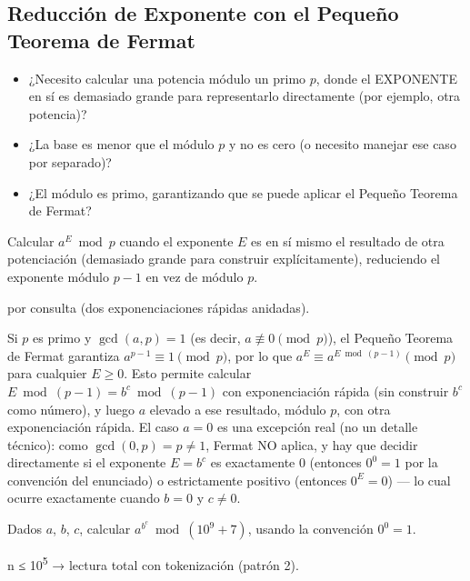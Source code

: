 \subsection{Reducción de Exponente con el Pequeño Teorema de Fermat}


\begin{itemize}
\item ¿Necesito calcular una potencia módulo un primo $p$, donde el EXPONENTE en sí es demasiado grande para representarlo directamente (por ejemplo, otra potencia)?
\item ¿La base es menor que el módulo $p$ y no es cero (o necesito manejar ese caso por separado)?
\item ¿El módulo es primo, garantizando que se puede aplicar el Pequeño Teorema de Fermat?
\end{itemize}

 Calcular $a^{E} \bmod p$ cuando el exponente $E$ es en sí mismo el resultado de otra potenciación (demasiado grande para construir explícitamente), reduciendo el exponente módulo $p-1$ en vez de módulo $p$.

  por consulta (dos exponenciaciones rápidas anidadas).

 Si $p$ es primo y $\gcd(a,p)=1$ (es decir, $a \not\equiv 0 \pmod p$), el Pequeño Teorema de Fermat garantiza $a^{p-1} \equiv 1 \pmod p$, por lo que $a^{E} \equiv a^{E \bmod (p-1)} \pmod p$ para cualquier $E \ge 0$. Esto permite calcular $E \bmod (p-1) = b^c \bmod (p-1)$ con exponenciación rápida (sin construir $b^c$ como número), y luego $a$ elevado a ese resultado, módulo $p$, con otra exponenciación rápida. El caso $a=0$ es una excepción real (no un detalle técnico): como $\gcd(0,p)=p \ne 1$, Fermat NO aplica, y hay que decidir directamente si el exponente $E=b^c$ es exactamente 0 (entonces $0^0=1$ por la convención del enunciado) o estrictamente positivo (entonces $0^E=0$) — lo cual ocurre exactamente cuando $b=0$ y $c \ne 0$.


Dados $a$, $b$, $c$, calcular $a^{b^c} \bmod (10^9+7)$, usando la convención $0^0=1$.

 n ≤ 10\textsuperscript{5} → lectura total con tokenización (patrón 2).


